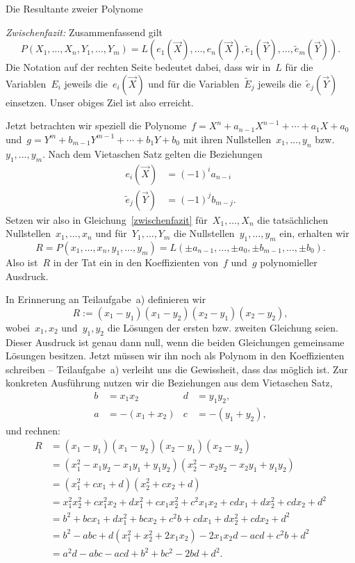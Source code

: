 \documentclass{algblatt}
\begin{document}
\begin{aufgabe}{Die Resultante zweier Polynome}
\begin{loesungE}
\emph{Zwischenfazit:} Zusammenfassend gilt
\begin{equation}\label{zwischenfazit}
  P(X_1,\ldots,X_n, Y_1,\ldots,Y_m) =
  L(e_1(\vec X),\ldots,e_n(\vec X), \widetilde e_1(\vec Y),\ldots,\widetilde e_m(\vec Y)).
\end{equation}
Die Notation auf der rechten Seite bedeutet dabei, dass wir in~$L$ für die
Variablen~$E_i$ jeweils die~$e_i(\vec X)$ und für die Variablen~$\widetilde E_j$ jeweils
die~$\widetilde e_j(\vec Y)$ einsetzen. Unser obiges Ziel ist also erreicht.

Jetzt betrachten wir speziell die Polynome~$f = X^n + a_{n-1}X^{n-1} + \cdots +
a_1X + a_0$ und~$g = Y^m + b_{m-1}Y^{m-1} + \cdots + b_1Y + b_0$ mit ihren
Nullstellen~$x_1,\ldots,y_n$ bzw.~$y_1,\ldots,y_m$. Nach dem Vietaschen Satz
gelten die Beziehungen
\begin{align*}
  e_i(\vec X) &= (-1)^i a_{n-i} \\
  \widetilde e_j(\vec Y) &= (-1)^j b_{m-j}.
\end{align*}
Setzen wir also in Gleichung~\eqref{zwischenfazit} für~$X_1,\ldots,X_n$ die
tatsächlichen Nullstellen~$x_1,\ldots,x_n$ und für~$Y_1,\ldots,Y_m$ die
Nullstellen~$y_1,\ldots,y_m$ ein, erhalten wir
\[ R = P(x_1,\ldots,x_n,y_1,\ldots,y_m) =
  L(\pm a_{n-1},\ldots,\pm a_0, \pm b_{m-1},\ldots,\pm b_0). \]
Also ist~$R$ in der Tat ein in den Koeffizienten von~$f$ und~$g$ polynomieller
Ausdruck.

\item In Erinnerung an Teilaufgabe~a) definieren wir
\[ R := (x_1 - y_1) (x_1 - y_2) (x_2 - y_1) (x_2 - y_2), \]
wobei~$x_1,x_2$ und~$y_1,y_2$ die Lösungen der ersten bzw. zweiten Gleichung
seien. Dieser Ausdruck ist genau dann null, wenn die beiden Gleichungen
gemeinsame Lösungen besitzen. Jetzt müssen wir ihn noch als Polynom in den
Koeffizienten schreiben -- Teilaufgabe~a) verleiht uns die Gewissheit, dass das
möglich ist. Zur konkreten Ausführung nutzen wir die Beziehungen aus dem
Vietaschen Satz,
\begin{align*}
  b &= x_1 x_2 & d &= y_1 y_2, \\
  a &= -(x_1+x_2) & c &= -(y_1 + y_2),
\end{align*}
und rechnen:
\begin{align*}
  R &= (x_1 - y_1) (x_1 - y_2) (x_2 - y_1) (x_2 - y_2) \\
  &= (x_1^2 - x_1y_2 - x_1y_1 + y_1y_2) (x_2^2 - x_2y_2 - x_2y_1 + y_1y_2) \\
  &= (x_1^2 + cx_1 + d) (x_2^2 + cx_2 + d) \\
  &= x_1^2 x_2^2 + c x_1^2 x_2 + d x_1^2 + c x_1 x_2^2 + c^2 x_1 x_2 +
    c d x_1 + d x_2^2 + cd x_2 + d^2 \\
  &= b^2 + bcx_1 + dx_1^2 + bcx_2 + c^2b + cdx_1 + dx_2^2 + cdx_2 + d^2 \\
  &= b^2 - abc + d(x_1^2 + x_2^2 + 2x_1x_2) - 2x_1x_2d - acd + c^2b + d^2 \\
  &= a^2d - abc - acd + b^2 + bc^2 - 2bd + d^2.
\end{align*}


\end{loesungE}
\end{aufgabe}
\end{document}
